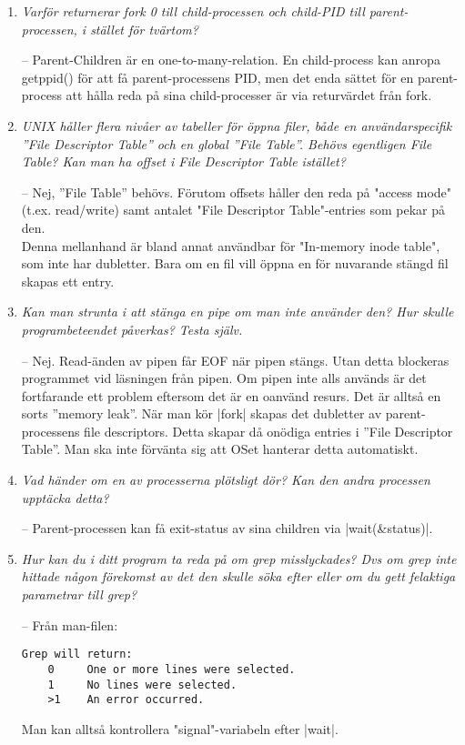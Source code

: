 \documentclass[paper=a4, fontsize=11pt]{scrartcl} %
\numberwithin{equation}{section} %
\numberwithin{figure}{section} %
\numberwithin{table}{section} %
\begin{document}
\begin{enumerate}[1)]
\item \emph{Varför returnerar fork 0 till child-processen och child-PID till
  parent-processen, i stället för tvärtom?}

-- Parent-Children är en one-to-many-relation. En child-process kan anropa
getppid() för att få parent-processens PID,
men det enda sättet för en parent-process att hålla reda på sina
child-processer är via returvärdet från fork.

\item \emph{UNIX håller flera nivåer av tabeller för öppna filer, både en
  användarspecifik ''File Descriptor Table'' och en global ''File Table''.
Behövs egentligen File Table? Kan man ha offset i File Descriptor Table
istället?}

-- Nej, ''File Table'' behövs. Förutom offsets håller den reda på "access mode"
(t.ex. read/write) samt antalet "File Descriptor Table"-entries som pekar på
den.\\
Denna mellanhand är bland annat användbar för "In-memory inode table", som inte
har dubletter. Bara om en fil vill öppna en för nuvarande stängd fil skapas
ett entry.

\item \emph{Kan man strunta i att stänga en pipe om man inte använder den? Hur
  skulle programbeteendet påverkas? Testa själv.}

-- Nej. Read-änden av pipen får EOF när pipen stängs. Utan detta blockeras
programmet vid läsningen från pipen.
Om pipen inte alls används är det fortfarande ett problem eftersom det är en
oanvänd resurs. Det är alltså en sorts ''memory leak''. När man kör |fork|
skapas det dubletter av parent-processens file descriptors. Detta skapar då
onödiga entries i ''File Descriptor Table''. Man ska inte förvänta sig att
OSet hanterar detta automatiskt.

\item \emph{Vad händer om en av processerna plötsligt dör? Kan den andra
  processen upptäcka detta?}

-- Parent-processen kan få exit-status av sina children via |wait(&status)|.

\item \emph{Hur kan du i ditt program ta reda på om grep misslyckades? Dvs om
  grep inte hittade någon förekomst av det den skulle söka efter eller om du
gett felaktiga parametrar till grep?}

-- Från man-filen:
\begin{verbatim}
Grep will return:
    0     One or more lines were selected.
    1     No lines were selected.
    >1    An error occurred.
\end{verbatim}

Man kan alltså kontrollera "signal"-variabeln efter |wait|.

\end{enumerate}
\end{document}
